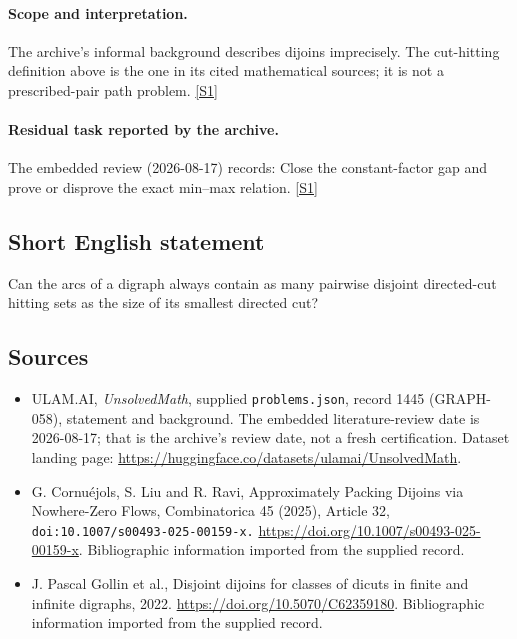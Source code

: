 \documentclass[11pt,a4paper]{article}
\newcommand{\sref}[2]{\hyperlink{source:#1:#2}{[S#2]}}
\begin{document}
\paragraph{Scope and interpretation.}

The archive’s informal background describes dijoins imprecisely. The cut-hitting definition above is the one in its cited mathematical sources; it is not a prescribed-pair path problem. \sref{1445}{1}

\paragraph{Residual task reported by the archive.}

The embedded review (2026-08-17) records: Close the constant-factor gap and prove or disprove the exact min--max relation. \sref{1445}{1}

\subsection{Short English statement}

Can the arcs of a digraph always contain as many pairwise disjoint directed-cut hitting sets as the size of its smallest directed cut?

\subsection{Sources}

{\small

\begin{itemize}

\item[\hypertarget{source:1445:1}{S1}] ULAM.AI, \emph{UnsolvedMath}, supplied \texttt{problems.json}, record 1445 (GRAPH-058), statement and background. The embedded literature-review date is 2026-08-17; that is the archive’s review date, not a fresh certification. Dataset landing page: \url{https://huggingface.co/datasets/ulamai/UnsolvedMath}.

\item[\hypertarget{source:1445:2}{S2}] G. Cornuéjols, S. Liu and R. Ravi, Approximately Packing Dijoins via Nowhere-Zero Flows, Combinatorica 45 (2025), Article 32, \nolinkurl{doi:10.1007/s00493-025-00159-x.} \url{https://doi.org/10.1007/s00493-025-00159-x}. Bibliographic information imported from the supplied record.

\item[\hypertarget{source:1445:3}{S3}] J. Pascal Gollin et al., Disjoint dijoins for classes of dicuts in finite and infinite digraphs, 2022. \url{https://doi.org/10.5070/C62359180}. Bibliographic information imported from the supplied record.

\end{itemize}

}

\label{end:1445}
\end{document}

